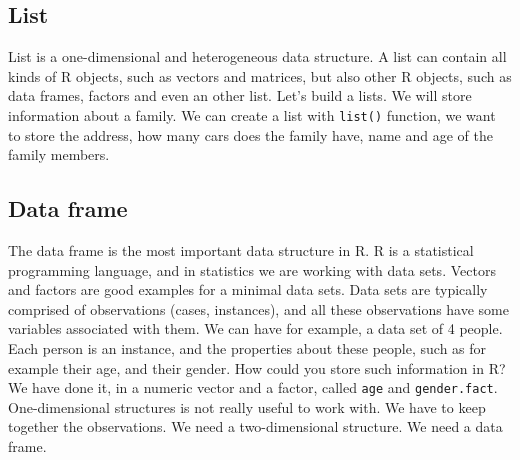 \documentclass[
]{book}
\newenvironment{Shaded}{\begin{snugshade}}{\end{snugshade}}
\newcommand{\AttributeTok}[1]{\textcolor[rgb]{0.77,0.63,0.00}{#1}}
\newcommand{\CommentTok}[1]{\textcolor[rgb]{0.56,0.35,0.01}{\textit{#1}}}
\newcommand{\DecValTok}[1]{\textcolor[rgb]{0.00,0.00,0.81}{#1}}
\newcommand{\FunctionTok}[1]{\textcolor[rgb]{0.00,0.00,0.00}{#1}}
\newcommand{\NormalTok}[1]{#1}
\newcommand{\OtherTok}[1]{\textcolor[rgb]{0.56,0.35,0.01}{#1}}
\newcommand{\StringTok}[1]{\textcolor[rgb]{0.31,0.60,0.02}{#1}}
\begin{document}
\hypertarget{list}{%
\subsection{List}\label{list}}

List is a one-dimensional and heterogeneous data structure. A list can contain all kinds of R objects, such as vectors and matrices, but also other R objects, such as data frames, factors and even an other list.
Let's build a lists. We will store information about a family. We can create a list with \texttt{list()} function, we want to store the address, how many cars does the family have, name and age of the family members.

\begin{Shaded}
\end{Shaded}

\hypertarget{data-frame}{%
\subsection{Data frame}\label{data-frame}}

The data frame is the most important data structure in R. R is a statistical programming language, and in statistics we are working with data sets. Vectors and factors are good examples for a minimal data sets. Data sets are typically comprised of observations (cases, instances), and all these observations have some variables associated with them. We can have for example, a data set of 4 people. Each person is an instance, and the properties about these people, such as for example their age, and their gender. How could you store such information in R? We have done it, in a numeric vector and a factor, called \texttt{age} and \texttt{gender.fact}. One-dimensional structures is not really useful to work with. We have to keep together the observations. We need a two-dimensional structure. We need a data frame.
\end{document}
